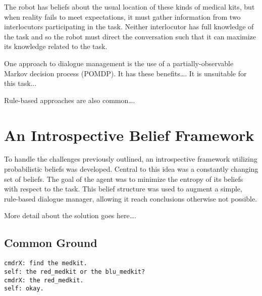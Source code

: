 \documentclass[12pt]{article}
\begin{document}
The robot has beliefs about the usual location of these kinds of
medical kits, but when reality fails to meet expectations, it must
gather information from two interlocutors participating in the
task. Neither interlocutor has full knowledge of the task and so the
robot must direct the conversation such that it can maximize its
knowledge related to the task.

One approach to dialogue management is the use of a
partially-observable Markov decision process (POMDP). It has these
benefits\dots. It is unsuitable for this task...

Rule-based approaches are also common\dots.

\section{An Introspective Belief Framework}
\label{sec:framework}

To handle the challenges previously outlined, an introspective
framework utilizing probabilistic beliefs was developed. Central to
this idea was a constantly changing set of beliefs. The goal of the
agent was to minimize the entropy of its beliefs with respect to the
task. This belief structure was used to augment a simple, rule-based
dialogue manager, allowing it reach conclusions otherwise not
possible.

More detail about the solution goes here\dots.

\subsection{Common Ground}
\begin{verbatim}
cmdrX: find the medkit.
self: the red_medkit or the blu_medkit?
cmdrX: the red_medkit.
self: okay.
\end{verbatim}
\end{document}
